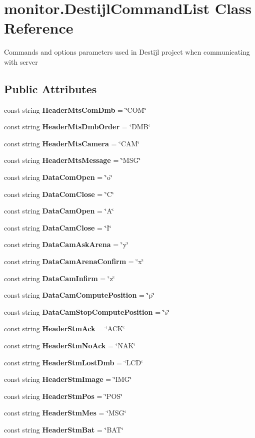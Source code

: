 \section{monitor.\+Destijl\+Command\+List Class Reference}
\label{classmonitor_1_1_destijl_command_list}


Commands and options parameters used in Destijl project when communicating with server  


\subsection*{Public Attributes}
\begin{DoxyCompactItemize}
\item 
const string \textbf{ Header\+Mts\+Com\+Dmb} = \char`\"{}C\+OM\char`\"{}
\item 
const string \textbf{ Header\+Mts\+Dmb\+Order} = \char`\"{}D\+MB\char`\"{}
\item 
const string \textbf{ Header\+Mts\+Camera} = \char`\"{}C\+AM\char`\"{}
\item 
const string \textbf{ Header\+Mts\+Message} = \char`\"{}M\+SG\char`\"{}
\item 
const string \textbf{ Data\+Com\+Open} = \char`\"{}o\char`\"{}
\item 
const string \textbf{ Data\+Com\+Close} = \char`\"{}C\char`\"{}
\item 
const string \textbf{ Data\+Cam\+Open} = \char`\"{}A\char`\"{}
\item 
const string \textbf{ Data\+Cam\+Close} = \char`\"{}I\char`\"{}
\item 
const string \textbf{ Data\+Cam\+Ask\+Arena} = \char`\"{}y\char`\"{}
\item 
const string \textbf{ Data\+Cam\+Arena\+Confirm} = \char`\"{}x\char`\"{}
\item 
const string \textbf{ Data\+Cam\+Infirm} = \char`\"{}z\char`\"{}
\item 
const string \textbf{ Data\+Cam\+Compute\+Position} = \char`\"{}p\char`\"{}
\item 
const string \textbf{ Data\+Cam\+Stop\+Compute\+Position} = \char`\"{}s\char`\"{}
\item 
const string \textbf{ Header\+Stm\+Ack} = \char`\"{}A\+CK\char`\"{}
\item 
const string \textbf{ Header\+Stm\+No\+Ack} = \char`\"{}N\+AK\char`\"{}
\item 
const string \textbf{ Header\+Stm\+Lost\+Dmb} = \char`\"{}L\+CD\char`\"{}
\item 
const string \textbf{ Header\+Stm\+Image} = \char`\"{}I\+MG\char`\"{}
\item 
const string \textbf{ Header\+Stm\+Pos} = \char`\"{}P\+OS\char`\"{}
\item 
const string \textbf{ Header\+Stm\+Mes} = \char`\"{}M\+SG\char`\"{}
\item 
const string \textbf{ Header\+Stm\+Bat} = \char`\"{}B\+AT\char`\"{}
\end{DoxyCompactItemize}


